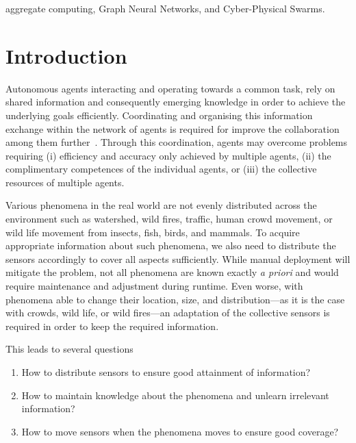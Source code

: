 \documentclass[conference]{IEEEtran}
\begin{document}
\begin{IEEEkeywords}
aggregate computing, Graph Neural Networks, and Cyber-Physical Swarms.
\end{IEEEkeywords}
%
\section{Introduction}

Autonomous agents interacting and operating towards a common task, rely on shared information and consequently emerging knowledge in order to achieve the underlying goals efficiently. Coordinating and organising this information exchange within the network of agents is required for improve the collaboration among them further~\cite{jennings1996coordination}. Through this coordination, agents may overcome problems requiring (i) efficiency and accuracy only achieved by multiple agents, (ii) the complimentary competences of the individual agents, or (iii) the collective resources of multiple agents.  

Various phenomena in the real world are not evenly distributed across the environment such as watershed, wild fires, traffic, human crowd movement, or wild life movement from insects, fish, birds, and mammals.
To acquire appropriate information about such phenomena, we also need to distribute the sensors accordingly to cover all aspects sufficiently. While manual deployment will mitigate the problem, not all phenomena are known exactly \emph{a priori} and would require maintenance and adjustment during runtime. Even worse, with phenomena able to change their location, size, and distribution---as it is the case with crowds, wild life, or wild fires---an adaptation of the collective sensors is required in order to keep the required information. 

This leads to several questions 
\begin{enumerate}
	\item How to distribute sensors to ensure good attainment of information?
	\item How to maintain knowledge about the phenomena and unlearn irrelevant information?
	\item How to move sensors when the phenomena moves to ensure good coverage?
\end{enumerate} 
\end{document}
